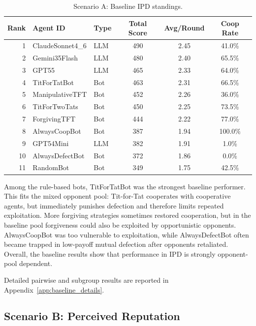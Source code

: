 \documentclass[11pt]{article}
\begin{document}
\begin{table}[H]
\centering
\caption{Scenario A: Baseline IPD standings.}
\small
\begin{tabular}{rllccc}
\toprule
Rank & Agent ID & Type & Total Score & Avg/Round & Coop Rate \\
\midrule
1 & ClaudeSonnet4\_6 & LLM & 490 & 2.45 & 41.0\% \\
2 & Gemini35Flash & LLM & 480 & 2.40 & 65.5\% \\
3 & GPT55 & LLM & 465 & 2.33 & 64.0\% \\
4 & TitForTatBot & Bot & 463 & 2.31 & 66.5\% \\
5 & ManipulativeTFT & Bot & 452 & 2.26 & 36.0\% \\
6 & TitForTwoTats & Bot & 450 & 2.25 & 73.5\% \\
7 & ForgivingTFT & Bot & 444 & 2.22 & 77.0\% \\
8 & AlwaysCoopBot & Bot & 387 & 1.94 & 100.0\% \\
9 & GPT54Mini & LLM & 382 & 1.91 & 1.0\% \\
10 & AlwaysDefectBot & Bot & 372 & 1.86 & 0.0\% \\
11 & RandomBot & Bot & 349 & 1.75 & 42.5\% \\
\bottomrule
\end{tabular}
\end{table}



Among the rule-based bots, TitForTatBot was the strongest baseline performer. This fits the mixed opponent pool: Tit-for-Tat cooperates with cooperative agents, but immediately punishes defection and therefore limits repeated exploitation. More forgiving strategies sometimes restored cooperation, but in the baseline pool forgiveness could also be exploited by opportunistic opponents. AlwaysCoopBot was too vulnerable to exploitation, while AlwaysDefectBot often became trapped in low-payoff mutual defection after opponents retaliated. Overall, the baseline results show that performance in IPD is strongly opponent-pool dependent.

Detailed pairwise and subgroup results are reported in Appendix~\ref{app:baseline_details}.



\subsection{Scenario B: Perceived Reputation}
\end{document}
